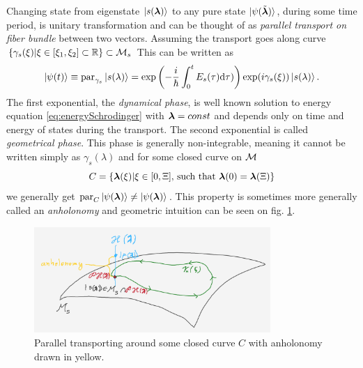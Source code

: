 Changing state from eigenstate $\ket{s({\bm\lambda})}$ to any pure state $\ket{\psi(\tilde{{\bm\lambda}})}$, during some time period, is unitary transformation and can be thought of as \emph{parallel transport on fiber bundle} between two vectors. Assuming the transport goes along curve $\{\gamma_s(\xi)|\xi\in[\xi_1,\xi_2]\subset \mathbb{R}\}\subset \mathcal{M}_s$ This can be written as
\begin{equation}
    \ket{\psi(t)} \equiv \textrm{par}_{\gamma_s}\ket{s(\lambda)} = \exp\left(-\frac{i}{\hbar}\int_0^tE_s(\tau)\mathrm{d}\tau)\right)\exp(i\gamma_s(\xi))\ket{s(\lambda)}.
    \label{eq:phasesOnManifold}
\end{equation}
The first exponential, the \emph{dynamical phase}, is well known solution to energy \Schrodinger equation \ref{eq:energySchrodinger} with ${\bm\lambda}=const$ and depends only on time and energy of states during the transport. The second exponential is called \emph{geometrical phase}. This phase is generally non-integrable, meaning it cannot be written simply as $\gamma_s(\lambda)$ and for some closed curve on $\mathcal{M}$
\begin{equation}
    C=\{{\bm\lambda}(\xi)|\xi\in[0,\Xi] \text{, such that }{\bm\lambda}(0)={\bm\lambda}(\Xi)\}
\end{equation} 
we generally get $\textrm{par}_C \ket{\psi({\bm\lambda})}\neq \ket{\psi({\bm\lambda})}$. This property is sometimes more generally called an \emph{anholonomy} %
and geometric intuition can be seen on fig. \ref{fig:parallelTransportClosed}.
\begin{figure}[h]
    \centering
    \includegraphics[width=0.8\textwidth]{../img/parallelTransportClosedCurve.png}
\caption{Parallel transporting around some closed curve $C$ with anholonomy drawn in yellow.}
    \label{fig:parallelTransportClosed}
\end{figure}

